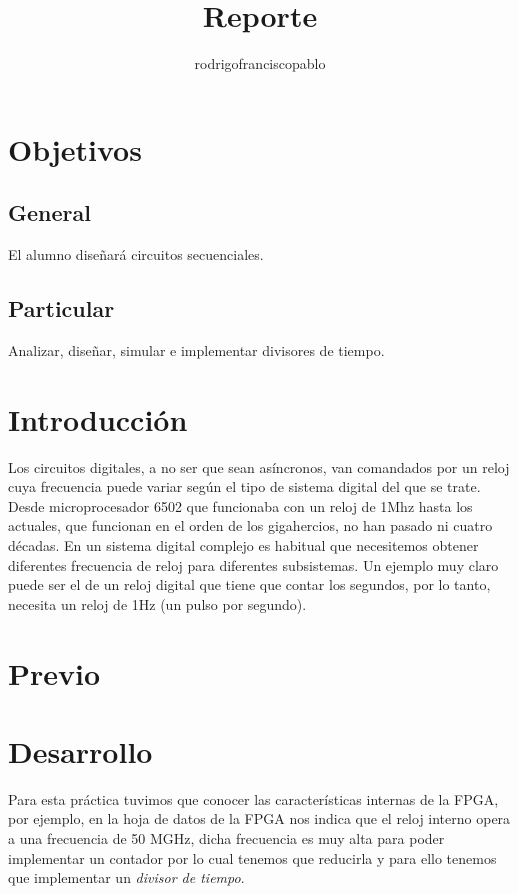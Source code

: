 \documentclass{mylib/reporteConCalif}
\title{Reporte}
\author{rodrigofranciscopablo }
\begin{document}
\coverPage

\section{Objetivos}

\subsection{General}

El alumno diseñará circuitos secuenciales.

\subsection{Particular}

Analizar, diseñar, simular e implementar divisores de tiempo.

\section{Introducción}
Los circuitos digitales, a no ser que sean asíncronos, van comandados por un reloj cuya frecuencia puede variar según el tipo de sistema digital del que se trate. Desde microprocesador 6502 que funcionaba con un reloj de 1Mhz hasta los actuales, que funcionan en el orden de los gigahercios, no han pasado ni cuatro décadas. En un sistema digital complejo es habitual que necesitemos obtener diferentes frecuencia de reloj para diferentes subsistemas. Un ejemplo muy claro puede ser el de un reloj digital que tiene que contar los segundos, por lo tanto, necesita un reloj de 1Hz (un pulso por segundo). 


\newpage
\section{Previo}

\newpage
\section{Desarrollo}

Para esta práctica tuvimos que conocer las características internas de la FPGA, por ejemplo, en la hoja de datos de la FPGA nos indica que el reloj interno opera a una frecuencia de 50 MGHz, dicha frecuencia es muy alta para poder implementar un contador por lo cual tenemos que reducirla y para ello tenemos que implementar un \textit{divisor de tiempo}.
\end{document}
